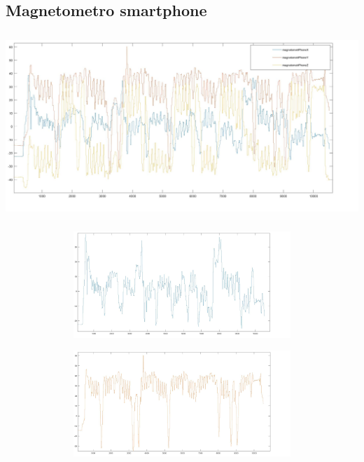 \documentclass[a4paper, oneside]{book}
\begin{document}
\subsection{Magnetometro smartphone}
\begin{minipage}{\linewidth}
\begin{center}
\includegraphics[width=160mm, height= 70mm]{./images/registrazione_tesi/mag_phXYZ.jpg} 
\end{center}
\end{minipage}
\makebox[\linewidth]{}
\makebox[\linewidth]{}\makebox[\linewidth]{}\makebox[\linewidth]{}
\makebox[\linewidth]{}\makebox[\linewidth]{}\makebox[\linewidth]{}
\makebox[\linewidth]{}\makebox[\linewidth]{}\makebox[\linewidth]{}

\begin{minipage}{\linewidth}
\begin{center}
\includegraphics[width=154mm, height= 40mm]{./images/registrazione_tesi/mag_phX.jpg} 
\end{center}
\end{minipage}

\begin{minipage}{\linewidth}
\begin{center}
\includegraphics[width=154mm, height= 40mm]{./images/registrazione_tesi/mag_phY.jpg} 
\end{center}
\end{minipage}
\makebox[\linewidth]{}
\end{document}
